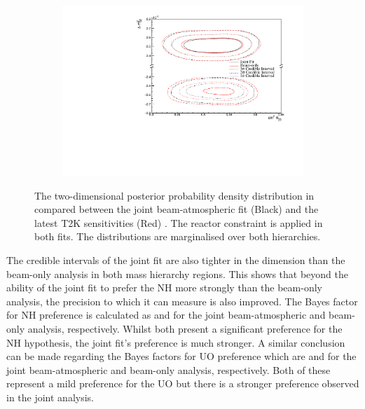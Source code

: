 \begin{figure}[h]
  \begin{subfigure}[t]{0.98\textwidth}
    \includegraphics[width=\textwidth, trim={0mm 0mm 0mm 0mm}, clip,page=1]{Figures/OA/JointFit_OA2020_wRC_Comp/ContourComparison_2D_th23_dm32_BH_1_wRC_UnSmeared_CredibleInterval.pdf}
  \end{subfigure}
  \caption{The two-dimensional posterior probability density distribution in  compared between the joint beam-atmospheric fit (Black) and the latest T2K sensitivities (Red) \cite{Dunne2020-uf, t2k_tn_393}. The reactor constraint is applied in both fits. The distributions are marginalised over both hierarchies.}
  \label{fig:OscillationAnalysis_JointFit_OA2020_wRC_TH23DM32}
\end{figure}

The credible intervals of the joint fit are also tighter in the  dimension than the beam-only analysis in both mass hierarchy regions. This shows that beyond the ability of the joint fit to prefer the NH more strongly than the beam-only analysis, the precision to which it can measure  is also improved. The Bayes factor for NH preference is calculated as  and  for the joint beam-atmospheric and beam-only analysis, respectively. Whilst both present a significant preference for the NH hypothesis, the joint fit's preference is much stronger. A similar conclusion can be made regarding the Bayes factors for UO preference which are  and  for the joint beam-atmospheric and beam-only analysis, respectively. Both of these represent a mild preference for the UO but there is a stronger preference observed in the joint analysis.

